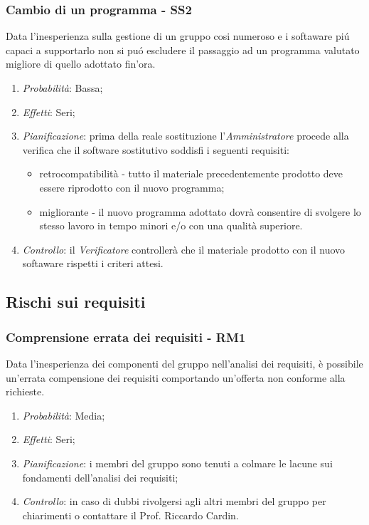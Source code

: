 \subsubsection{Cambio di un programma - SS2}
Data l'inesperienza sulla gestione di un gruppo cosi numeroso e i softaware pi\'u capaci a supportarlo non si pu\'o escludere il passaggio ad un programma valutato migliore di quello adottato fin'ora.
\begin{enumerate}
\item \textit{Probabilit\`a}: Bassa;
\item \textit{Effetti}: Seri;
\item \textit{Pianificazione}: prima della reale sostituzione l'\textit{Amministratore} procede alla verifica che il software sostitutivo soddisfi i seguenti requisiti:
  \begin{itemize}
    \item retrocompatibilit\`a - tutto il materiale precedentemente prodotto deve essere riprodotto con il nuovo programma;
    \item migliorante - il nuovo programma adottato dovr\`a consentire di svolgere lo stesso lavoro in tempo minori e/o con una qualit\`a superiore.
  \end{itemize}
\item \textit{Controllo}: il \textit{Verificatore} controller\`a che il materiale prodotto con il nuovo softaware rispetti i criteri attesi.
\end{enumerate}

\subsection{Rischi sui requisiti}
\subsubsection{Comprensione errata dei requisiti - RM1}
Data l'inesperienza dei componenti del gruppo nell'analisi dei requisiti, \`e possibile un'errata compensione dei requisiti comportando un'offerta non conforme alla richieste.
\begin{enumerate}
\item \textit{Probabilit\`a}: Media;
\item \textit{Effetti}: Seri;
\item \textit{Pianificazione}: i membri del gruppo sono tenuti a colmare le lacune sui fondamenti dell'analisi dei requisiti;
\item \textit{Controllo}: in caso di dubbi rivolgersi agli altri membri del gruppo per chiarimenti o contattare il Prof. Riccardo Cardin.
\end{enumerate}

